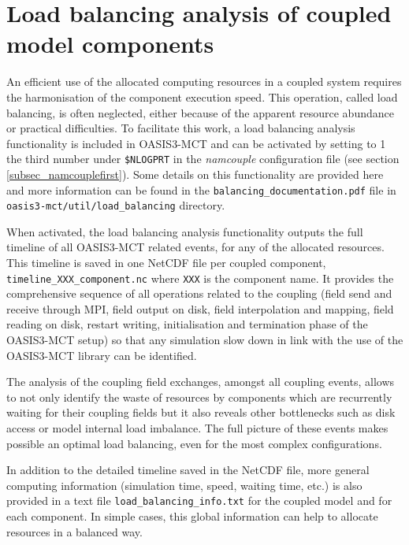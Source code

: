 \section{Load balancing analysis of coupled model components}
\label{lucia}

  An efficient use of the allocated computing resources in a coupled system requires the harmonisation of the component execution speed. This operation, called load balancing, is often neglected, either because of the apparent resource abundance or practical difficulties.
 To facilitate this work, a load balancing analysis functionality is included in OASIS3-MCT and can be activated by setting to 1 the third number under {\tt \$NLOGPRT} in the  {\it namcouple} configuration file (see section \ref{subsec_namcouplefirst}). Some details on this functionality are provided here and more information can be found in the {\tt balancing\_documentation.pdf} file in {\tt
  oasis3-mct/util/load\_balancing} directory.

  When activated, the load balancing analysis functionality outputs the full timeline of all OASIS3-MCT related events, for any of the allocated resources. This timeline is saved in one NetCDF file per coupled component, {\tt timeline\_XXX\_component.nc} where {\tt XXX} is the component name. It provides the comprehensive sequence of all operations related to the coupling (field send and receive through MPI, field output on disk, field interpolation and mapping, field reading on disk, restart writing, initialisation and termination phase of the OASIS3-MCT setup) so that any simulation slow down in link with the use of the OASIS3-MCT library can be identified.

 The analysis of the coupling field exchanges, amongst all coupling events, allows to not only identify the waste of resources by components which are recurrently waiting for their coupling fields but it also reveals other bottlenecks such as disk access or model internal load imbalance. The full picture of these events makes possible an optimal load balancing, even for the most complex configurations.

 In addition to the detailed timeline saved in the NetCDF file, more general computing information (simulation time, speed, waiting time, etc.) is also provided in a text file {\tt load\_balancing\_info.txt}  for the coupled model and for each component. In simple cases, this global information can help to allocate resources in a balanced way.